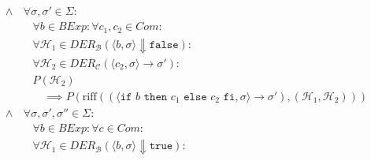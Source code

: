 \begin{align*}
																		\land             & \,\forall \sigma, \sigma' \in \Sigma :                                                                                                                                                                                     \\
																		                  & \quad \forall b \in \textit{BExp} : \forall c _ 1, c _ 2 \in \textit{Com} :                                                                                                                                                \\
																		                  & \quad \forall \mathcal{H} _ 1 \in \textit{DER} _ \mathcal{B} (\langle b, \sigma \rangle \Downarrow \texttt{false}) :                                                                                                       \\
																		                  & \quad \forall \mathcal{H} _ 2 \in \textit{DER} _ \mathcal{C} (\langle c _ 2, \sigma \rangle \rightarrow \sigma') :                                                                                                         \\
																		                  & \quad P(\mathcal{H} _ 2)                                                                                                                                                                                                   \\
																		                  & \quad\quad \implies P(\text{riff}((\langle \texttt{if } b \texttt{ then } c _ 1 \texttt{ else } c _ 2 \texttt{ fi}, \sigma \rangle \rightarrow \sigma'), (\mathcal{H} _ 1, \mathcal{H} _ 2)))                              \\
																		\land             & \,\forall \sigma, \sigma', \sigma'' \in \Sigma :                                                                                                                                                                           \\
																		                  & \quad \forall b \in \textit{BExp} : \forall c \in \textit{Com} :                                                                                                                                                           \\
																		                  & \quad \forall \mathcal{H} _ 1 \in \textit{DER} _ \mathcal{B} (\langle b, \sigma \rangle \Downarrow \texttt{true}) :                                                                                                        \\

\end{align*}
